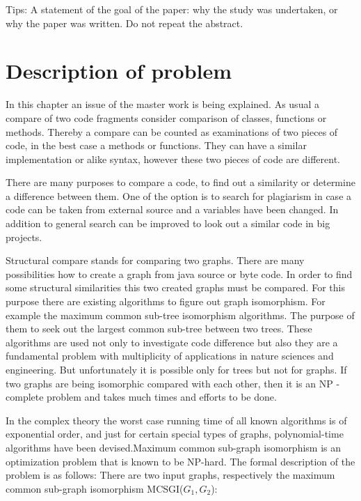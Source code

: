 \documentclass{report}
\begin{document}
Tips:
A statement of the goal of the paper: why the study was undertaken, or why the paper was written. Do not repeat the abstract. 

 

\newpage	
\chapter{Description of problem}
\label{cha:Description}

In this chapter an issue of the master work is being explained. As usual a compare of two code fragments consider comparison of classes, functions or methods. Thereby a compare can be counted as examinations of two pieces of code, in the best case a methods or functions. They can have a similar implementation or alike syntax, however these two pieces of code are different.

There are many purposes to compare a code, to find out a similarity or determine a difference between them. One of the option is to search for plagiarism in case a code can be taken from external source and a variables have been changed. In addition to general search can be improved to look out a similar code in big projects. 

Structural compare stands for comparing two graphs. There are many possibilities how to create a graph from java source or byte code. In order to find some structural similarities this two created graphs must be compared. For this purpose there are existing algorithms to figure out graph isomorphism. For example the maximum common sub-tree isomorphism algorithms. The purpose of them to seek out the largest common sub-tree between two trees. These algorithms are used not only to investigate code difference but also they are a fundamental problem with multiplicity of applications in nature sciences and engineering.
But unfortunately it is possible only for trees but not for graphs. If two graphs are being isomorphic compared with each other, then it is an NP - complete problem and takes much times and efforts to be done. 

In the complex theory the worst case running time of all known algorithms is of exponential order, and just for certain special types of graphs, polynomial-time algorithms have been devised\cite{graph_isomorphism_is}.Maximum common sub-graph isomorphism is an optimization problem that is known to be NP-hard. The formal description of the problem is as follows:
There are two input graphs, respectively the maximum common sub-graph isomorphism MCSGI($ G_{1}, G_{2}$):
\end{document}
